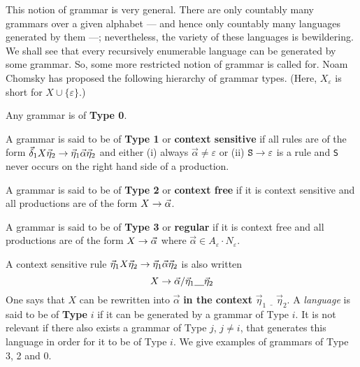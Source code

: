 This notion of grammar is very general. There are only countably
many grammars over a given alphabet --- and hence only countably
many languages generated by them ---; nevertheless, the variety
of these languages is bewildering. We shall see that every
recursively enumerable language can be generated by some grammar.
So, some more restricted notion of grammar is called for. Noam
Chomsky has proposed the following hierarchy of grammar types.
(Here, $X_{\varepsilon}$ is short for $X \cup \{\varepsilon\}$.)
\begin{dinglist}{43}
\item
Any grammar is of \textbf{Type 0}.
\item
A grammar is said to be of \textbf{Type 1} or \textbf{context sensitive}
if all rules are of the form $\vec{\delta}_1 X \vec{\eta}_2 \rightarrow
\vec{\eta}_1 \vec{\alpha} \vec{\eta}_2$ and either (i) always
$\vec{\alpha} \neq \varepsilon$ or (ii) $\mbox{\tt S} \rightarrow \varepsilon$ 
is a rule and {\tt S} never occurs on the right hand side of a production.
\item
A grammar is said to be of \textbf{Type 2} or \textbf{context free}
if it is context sensitive and all productions are of the form
$X \rightarrow \vec{\alpha}$.
\item
A grammar is said to be of \textbf{Type 3} or \textbf{regular} if it is
context free and all productions are of the form $X \rightarrow
\vec{\alpha}$ where $\vec{\alpha} \in A_{\varepsilon} \cdot
N_{\varepsilon}$.
\end{dinglist}
A context sensitive rule $\vec{\eta}_1 X\vec{\eta}_2 \rightarrow
\vec{\eta}_1\vec{\alpha}\vec{\eta}_2$ is also written
\begin{equation}
X \rightarrow \vec{\alpha} /\vec{\eta}_1\underline{\quad}\vec{\eta}_2
\end{equation}
One says that $X$ can be rewritten into $\vec{\alpha}$ \textbf{in 
the context} $\vec{\eta}_1\underline{\quad}\vec{\eta}_2$.
A {\it language\/} is said to be of \textbf{Type} $i$ 
if it can be
generated by a grammar of Type $i$. It is not relevant if there
also exists a grammar of Type $j$, $j \neq i$, that generates this
language in order for it to be of Type $i$. We give examples of 
grammars of Type 3, 2 and 0.

